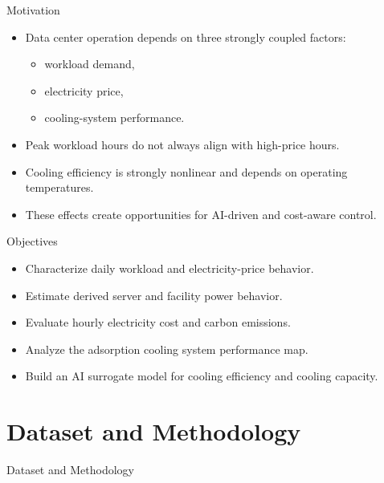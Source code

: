 \documentclass[
  ignorenonframetext,
  aspectratio=169,
]{beamer}
\providecommand{\tightlist}{%
  \setlength{\itemsep}{0pt}\setlength{\parskip}{0pt}}\usepackage{longtable,booktabs,array}
\begin{document}
\begin{frame}{Motivation}
\label{motivation}
\begin{itemize}
\tightlist
\item
  Data center operation depends on three strongly coupled factors:

  \begin{itemize}
  \tightlist
  \item
    workload demand,
  \item
    electricity price,
  \item
    cooling-system performance.
  \end{itemize}
\end{itemize}

\vspace{0.8em}

\begin{itemize}
\tightlist
\item
  Peak workload hours do not always align with high-price hours.
\item
  Cooling efficiency is strongly nonlinear and depends on operating
  temperatures.
\item
  These effects create opportunities for AI-driven and cost-aware
  control.
\end{itemize}
\end{frame}

\begin{frame}{Objectives}
\label{objectives}
\begin{itemize}
\tightlist
\item
  Characterize daily workload and electricity-price behavior.
\item
  Estimate derived server and facility power behavior.
\item
  Evaluate hourly electricity cost and carbon emissions.
\item
  Analyze the adsorption cooling system performance map.
\item
  Build an AI surrogate model for cooling efficiency and cooling
  capacity.
\end{itemize}
\end{frame}

\section{Dataset and Methodology}\label{dataset-and-methodology}

\begin{frame}{Dataset and Methodology}
\hypertarget{sec:data}{}
\end{frame}
\end{document}
